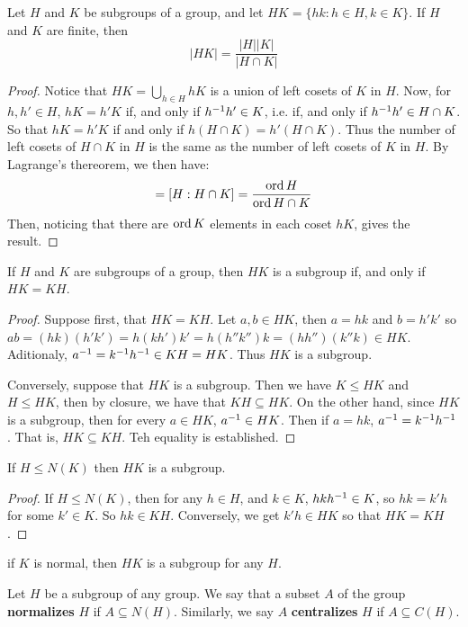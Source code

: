 \begin{theorem}\label{lemma_3.3.6}
  Let $H$ and  $K$ be subgroups of a group, and let  $HK=\{hk : h \in H, k \in
  K\}$. If $H$ and $K$ are finite, then
  \begin{equation}
    |HK|=\frac{|H||K|}{|H \cap K|}
  \end{equation}
\end{theorem}
\begin{proof}
  Notice that $HK=\bigcup_{h \in H}{hK}$ is a union of left cosets of $K$ in
  $H$. Now, for  $h,h' \in H$,  $hK=h'K$ if, and only if  $h^{-1}h' \in K$,
  i.e. if, and only if $h^{-1}h' \in H \cap K$. So that $hK=h'K$ if and only
  if  $h(H \cap K)=h'(H \cap K)$. Thus the number of left cosets of $H \cap K$
  in $H$ is the same as the number of left cosets of  $K$ in  $H$. By
  Lagrange's thereorem, we then have:
  \begin{equation*}
    [H:K]=[H: H \cap K]=\frac{\ord{H}}{\ord{H \cap K}}
  \end{equation*}
  Then, noticing that there are $\operatorname{ord}{K}$ elements in each coset $hK$, gives
  the result.
\end{proof}

\begin{lemma}\label{lemma_3.3.7}
  If $H$ and $K$ are subgroups of a group, then $HK$ is a subgroup if, and
  only if  $HK=KH$.
\end{lemma}
\begin{proof}
  Suppose first, that $HK=KH$. Let $a,b \in HK$, then $a=hk$ and  $b=h'k'$ so
  $ab=(hk)(h'k')=h(kh')k'=h(h''k'')k=(hh'')(k''k) \in HK$. Aditionaly,
  $a^{-1}=k^{-1}h^{-1} \in KH=HK$. Thus $HK$ is a subgroup.

  Conversely, suppose that  $HK$ is a subgroup. Then we have  $K \leq HK$ and
  $H \leq HK$, then by closure, we have that  $KH \subseteq HK$. On the
  other hand, since  $HK$ is a subgroup, then for every  $a \in HK$,
  $a^{-1} \in HK$. Then if $a=hk$,  $a^{-1}=k^{-1}h^{-1}$. That is, $HK
  \subseteq KH$. Teh equality is established.
\end{proof}
\begin{corollary}
  If $H \leq N(K)$ then $HK$ is a subgroup.
\end{corollary}
\begin{proof}
  If $H \leq N(K)$, then for any $h \in H$, and  $k \in K$,  $hkh^{-1} \in
  K$, so $hk=k'h$ for some  $k' \in K$. So  $hk \in KH$. Conversely, we get
  $k'h \in HK$ so that  $HK=KH$.
\end{proof}
\begin{corollary}
  if $K$ is normal, then $HK$ is a subgroup for any $H$.
\end{corollary}

\begin{definition}
  Let $H$ be a subgroup of any group. We say that a subset $A$ of the group
  \textbf{normalizes} $H$ if  $A \subseteq N(H)$. Similarly, we say $A$
  \textbf{centralizes} $H$ if  $A \subseteq C(H)$.
\end{definition}
